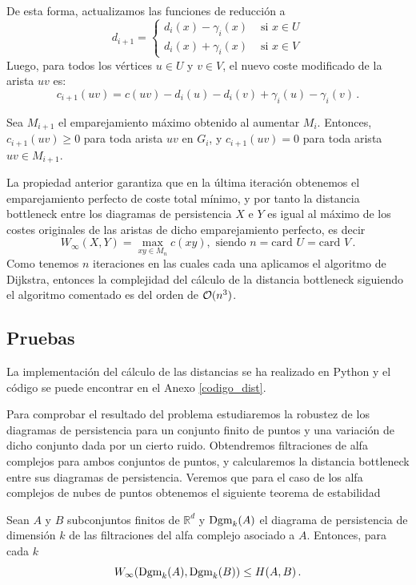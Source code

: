 De esta forma, actualizamos las funciones de reducción a
\[
d_{i+1} = \begin{cases}
d_i(x) - \gamma_i(x) & \text{ si } x \in U \\ 
d_i(x) + \gamma_i(x) & \text{ si } x \in V 
\end{cases}
\]
Luego, para todos los vértices $u \in U$ y $v \in V$, el nuevo coste modificado de la arista $uv$ es:
\[
c_{i+1}(uv)=c(uv) - d_i(u) - d_i(v) + \gamma_i(u) - \gamma_i(v)\,.
\]

\begin{property}
Sea $M_{i+1}$ el emparejamiento máximo obtenido al aumentar $M_i$. Entonces, $c_{i+1}(uv) \geq 0$ para toda arista $uv$ en $G_i$, y  $c_{i+1}(uv) = 0$ para toda arista $uv \in M_{i+1}$.
\end{property}

La propiedad anterior garantiza que en la última iteración obtenemos el emparejamiento perfecto de coste total mínimo, y por tanto la distancia bottleneck entre los diagramas de persistencia $X$ e $Y$ es igual al máximo de los costes originales de las aristas de dicho emparejamiento perfecto, es decir
\[
W_\infty(X,Y)=\max_{xy \in M_n} c(xy),\text{ siendo } n= \text{card } U = \text{card } V\,.
\]
Como tenemos $n$ iteraciones en las cuales cada una aplicamos el algoritmo de Dijkstra, entonces la complejidad del cálculo de la distancia bottleneck siguiendo el algoritmo comentado es del orden de $\mathcal{O}(n^3)$.

\subsection{Pruebas}
La implementación del cálculo de las distancias se ha realizado en Python y el código se puede encontrar en el Anexo \ref{codigo_dist}.

Para comprobar el resultado del problema estudiaremos la robustez de los diagramas de persistencia para un conjunto finito de puntos y una variación de dicho conjunto dada por un cierto ruido. Obtendremos filtraciones de alfa complejos para ambos conjuntos de puntos, y calcularemos la distancia bottleneck entre sus diagramas de persistencia. Veremos que para el caso de los alfa complejos de nubes de puntos obtenemos el siguiente teorema de estabilidad

\begin{theorem}\label{th:estabilidadAlfa}
Sean $A$ y $B$ subconjuntos finitos de $\mathbb{R}^d$ y $\text{\rm Dgm}_k(A)$ el diagrama de persistencia de dimensión $k$ de las filtraciones del alfa complejo asociado a $A$. Entonces, para cada $k$
\[
W_\infty(\text{\rm Dgm}_k(A), \text{\rm Dgm}_k(B)) \leq H(A, B)\,.
\]
\end{theorem}

